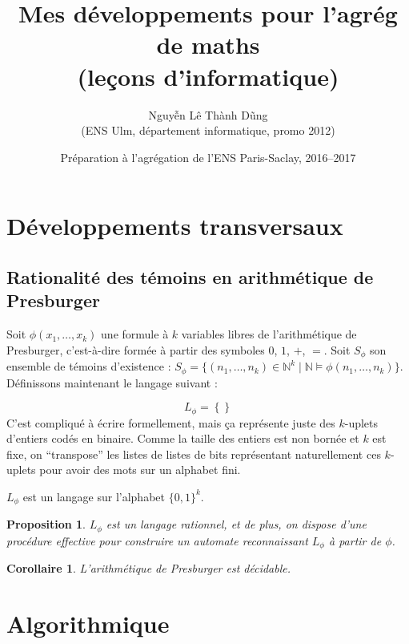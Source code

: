 \documentclass[a4paper, 11pt]{article}
\def\N{\mathbb{N}}
\newtheorem*{proposition}{Proposition}
\newtheorem*{corollary}{Corollaire}
\begin{document}
\title{Mes développements pour l'agrég de maths\\(leçons d'informatique)}
\author{Nguyễn Lê Thành Dũng\\(ENS Ulm, département informatique, promo 2012)}
\date{Préparation à l'agrégation de l'ENS Paris-Saclay, 2016--2017}
\maketitle

\tableofcontents


\section{Développements transversaux}

\subsection{Rationalité des témoins en arithmétique de Presburger}

Soit $\phi(x_1,\ldots,x_k)$ une formule à $k$ variables libres de l'arithmétique
de Presburger, c'est-à-dire formée à partir des symboles $0$, $1$, $+$, $=$.
Soit $S_\phi$ son ensemble de témoins d'existence : $S_\phi = \{ (n_1, \ldots,
n_k) \in \N^k \mid \N \models \phi(n_1, \ldots, n_k) \}$. Définissons maintenant
le langage suivant :

\[ L_\phi = \left\{  \right\}\]
C'est compliqué à écrire formellement, mais ça représente juste des $k$-uplets
d'entiers codés en binaire. Comme la taille des entiers est non bornée et $k$
est fixe, on \enquote{transpose} les listes de listes de bits représentant
naturellement ces $k$-uplets pour avoir des mots sur un alphabet fini.

$L_\phi$ est un langage sur l'alphabet $\{0,1\}^k$.

\begin{proposition}
  $L_\phi$ est un langage rationnel, et de plus, on dispose d'une procédure
  effective pour construire un automate reconnaissant $L_\phi$ à partir de
  $\phi$.
\end{proposition}

\begin{corollary}
  L'arithmétique de Presburger est décidable.
\end{corollary}


\section{Algorithmique}
\end{document}

